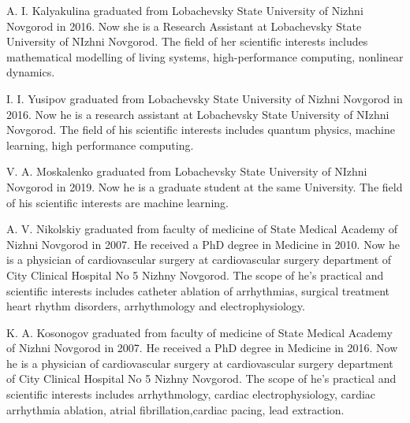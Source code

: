 \documentclass[submitted]{ieeeaccess}
\begin{document}
\begin{IEEEbiography}{A. I. Kalyakulina} graduated from Lobachevsky State University of Nizhni Novgorod in 2016. Now she is a Research Assistant at Lobachevsky State University of NIzhni Novgorod. The field of her scientific interests includes mathematical modelling of living systems, high-performance computing, nonlinear dynamics.      
\end{IEEEbiography}

\begin{IEEEbiography}{I. I. Yusipov} graduated from Lobachevsky State University of Nizhni Novgorod in 2016. Now he is a research assistant at Lobachevsky State University of NIzhni Novgorod. The field of his scientific interests includes quantum physics, machine learning, high performance computing.  
\end{IEEEbiography}

\begin{IEEEbiography}{V. A. Moskalenko} graduated from Lobachevsky State University of NIzhni Novgorod in 2019. Now he is a graduate student at the same University. The field of his scientific interests are machine learning.  
\end{IEEEbiography}






\begin{IEEEbiography}{A. V. Nikolskiy} graduated from faculty of medicine of State Medical Academy of Nizhni Novgorod in 2007. He received a PhD degree in Medicine in 2010. Now he is a physician of cardiovascular surgery at cardiovascular surgery department of City Clinical Hospital No 5 Nizhny Novgorod. The scope of he's practical and scientific interests includes catheter ablation of arrhythmias, surgical treatment heart rhythm disorders, arrhythmology and electrophysiology.  
\end{IEEEbiography}

\begin{IEEEbiography}{K. A. Kosonogov} graduated from faculty of medicine of State Medical Academy of Nizhni Novgorod in 2007. He received a PhD degree in Medicine in 2016. Now he is a physician of cardiovascular surgery at cardiovascular surgery department of City Clinical Hospital No 5 Nizhny Novgorod. The scope of he's practical and scientific interests includes arrhythmology, cardiac electrophysiology, cardiac arrhythmia ablation, atrial fibrillation,cardiac pacing, lead extraction. 
\end{IEEEbiography}
\end{document}
